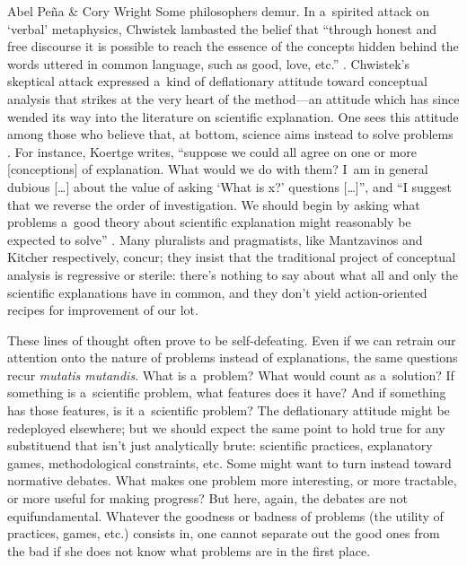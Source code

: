 \begin{editorialeng}{Abel Peña \& Cory Wright}
Some philosophers demur. In a~spirited attack on `verbal' metaphysics, Chwistek
\parencite*[][]{chwistek_tragedia_1932} %
 lambasted the belief that ``through honest and free discourse it is possible to reach the essence of the concepts hidden behind the words uttered in common language, such as good, love, etc.'' 
\parencite[][p.2]{trybus_tragedy_2017}. %
 Chwistek's skeptical attack expressed a~kind of deflationary attitude toward conceptual analysis that strikes at the very heart of the method---an attitude which has since wended its way into the literature on scientific explanation. One sees this attitude among those who believe that, at bottom, science aims instead to solve problems 
\parencites{laudan_progress_1977}{elliott_research_2021}{levenstein_problem-ladenness_2024}. %
 For instance, Koertge writes, ``suppose we could all agree on one or more [conceptions] of explanation. What would we do with them? I~am in general dubious […] about the value of asking `What is x?' questions […]'', and ``I suggest that we reverse the order of investigation. We should begin by asking what problems a~good theory about scientific explanation might reasonably be expected to solve'' 
\parencite[][pp.85–86]{koertge_explanation_1992}. %
 Many pluralists and pragmatists, like Mantzavinos 
\parencite*[][p.14]{mantzavinos_explanatory_2016} %
 and Kitcher 
\parencite*[][p.60]{kitcher_whats_2023} %
 respectively, concur; they insist that the traditional project of conceptual analysis is regressive or sterile: there's nothing to say about what all and only the scientific explanations have in common, and they don't yield action-oriented recipes for improvement of our lot.

These lines of thought often prove to be self-defeating. Even if we can retrain our attention onto the nature of problems instead of explanations, the same questions recur \textit{mutatis mutandis}. What is a~problem? What would count as a~solution? If something is a~scientific problem, what features does it have? And if something has those features, is it a~scientific problem? The deflationary attitude might be redeployed elsewhere; but we should expect the same point to hold true for any substituend that isn't just analytically brute: scientific practices, explanatory games, methodological constraints, etc. Some might want to turn instead toward normative debates. What makes one problem more interesting, or more tractable, or more useful for making progress? But here, again, the debates are not equifundamental. Whatever the goodness or badness of problems (the utility of practices, games, etc.) consists in, one cannot separate out the good ones from the bad if she does not know what problems are in the first place.


\end{editorialeng}
